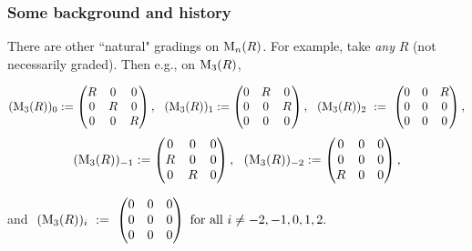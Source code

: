 \documentclass{beamer}
\begin{document}
\begin{frame}
\frametitle{Some background and history}
There are other ``natural"  gradings on ${\rm M}_n(R)$.   For example, take {\it any} $R$ (not necessarily graded).  Then  e.g., on $ {\rm M}_3(R)$, 

\scriptsize
$$ ( {\rm M}_3(R) )_0  :=   \begin{pmatrix}
R & 0 & 0 \\
0  & R & 0 \\
0 &  0 & R
\end{pmatrix},  \ \   ( {\rm M}_3(R) )_1  :=   \begin{pmatrix}
0 & R & 0 \\
0  & 0 & R \\
0 & 0 & 0 
\end{pmatrix}, \ \  ( {\rm M}_3(R) )_{2} \ := \   \begin{pmatrix}
0 & 0 & R \\
0   & 0 & 0 \\
0 & 0 & 0
\end{pmatrix}, $$
$$ ( {\rm M}_3(R) )_{-1}  :=   \begin{pmatrix}
0 & 0 & 0 \\
R  & 0 & 0 \\
0 &  R & 0
\end{pmatrix},  \ \   ( {\rm M}_3(R) )_{-2}  :=   \begin{pmatrix}
0 & 0 & 0 \\
0  & 0 & 0 \\
R & 0 & 0 
\end{pmatrix},$$

\bigskip

and $    \  ( {\rm M}_3(R) )_{i} \ := \   \begin{pmatrix}
0 & 0 & 0 \\
0   & 0 & 0 \\
0 & 0 & 0
\end{pmatrix} \mbox{ for all }  i \neq -2, -1, 0, 1, 2.$




\normalsize

\end{frame}
\end{document}
